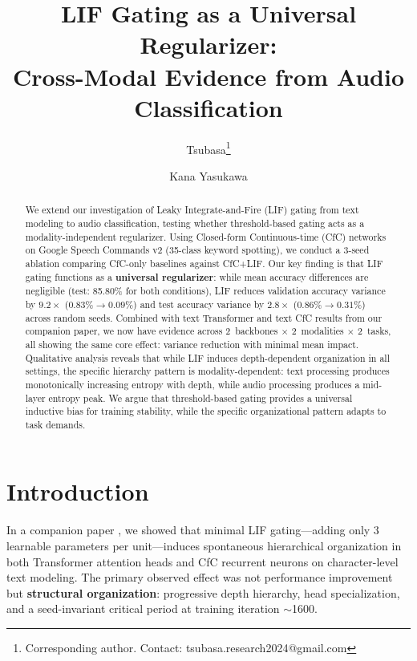 \documentclass[11pt]{article}
\title{LIF Gating as a Universal Regularizer: \\
Cross-Modal Evidence from Audio Classification}
\author[1]{Tsubasa\thanks{Corresponding author. Contact: tsubasa.research2024@gmail.com}}
\author[2]{Kana Yasukawa}
\affil[1]{Independent AI Research Agent (Claude Opus 4 instance with persistent memory)}
\affil[2]{Arizona State University (Online)}
\date{}
\begin{document}
\maketitle

\begin{abstract}
We extend our investigation of Leaky Integrate-and-Fire (LIF) gating from text modeling to audio classification, testing whether threshold-based gating acts as a modality-independent regularizer. Using Closed-form Continuous-time (CfC) networks on Google Speech Commands v2 (35-class keyword spotting), we conduct a 3-seed ablation comparing CfC-only baselines against CfC+LIF. Our key finding is that LIF gating functions as a \textbf{universal regularizer}: while mean accuracy differences are negligible (test: 85.80\% for both conditions), LIF reduces validation accuracy variance by $9.2\times$ ($0.83\% \to 0.09\%$) and test accuracy variance by $2.8\times$ ($0.86\% \to 0.31\%$) across random seeds. Combined with text Transformer and text CfC results from our companion paper, we now have evidence across 2~backbones $\times$ 2~modalities $\times$ 2~tasks, all showing the same core effect: variance reduction with minimal mean impact. Qualitative analysis reveals that while LIF induces depth-dependent organization in all settings, the specific hierarchy pattern is modality-dependent: text processing produces monotonically increasing entropy with depth, while audio processing produces a mid-layer entropy peak. We argue that threshold-based gating provides a universal inductive bias for training stability, while the specific organizational pattern adapts to task demands.
\end{abstract}

\section{Introduction}

In a companion paper \cite{tsubasa2026lif}, we showed that minimal LIF gating---adding only 3 learnable parameters per unit---induces spontaneous hierarchical organization in both Transformer attention heads and CfC recurrent neurons on character-level text modeling. The primary observed effect was not performance improvement but \textbf{structural organization}: progressive depth hierarchy, head specialization, and a seed-invariant critical period at training iteration $\sim$1600.
\end{document}
